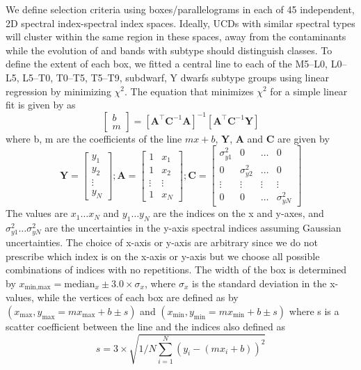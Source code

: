 \documentclass[manuscript]{aastex}
\begin{document}
We define selection criteria using boxes/parallelograms in each of 45 independent, 2D spectral index-spectral index spaces. Ideally, UCDs with similar spectral types will cluster within the same region in these spaces, away from the contaminants while the evolution of \wat and \meth  bands with subtype should distinguish classes. To define the extent of each box, we fitted a central line to each of  the  M5--L0, L0--L5, L5--T0, T0--T5, T5--T9, subdwarf, Y dwarfs subtype groups using linear regression by minimizing $\chi^2$. The equation that minimizes $\chi^2$ for a simple linear fit is given by \citealt{Hogg2010} as \begin{equation}  \begin{bmatrix}  b \\  m \end{bmatrix} =  [\mathbf{A}^\intercal \mathbf{C}^{-1} \mathbf{A}] ^{-1}  [\mathbf{A}^\intercal \mathbf{C}^{-1} \mathbf{Y}]  \end{equation} where b, m are the coefficients of the line $mx+b$,  $\mathbf{Y}$, $\mathbf{A}$ and  $\mathbf{C}$ are given by
\begin{equation} \mathbf{Y}=\begin{bmatrix}  y_1 \\  y_2 \\ \vdots  \\y_N  \end{bmatrix}; \mathbf{A}=\begin{bmatrix} 1 & x_1 \\  1& x_2 \\ \vdots & \vdots \\1 & x_N  \end{bmatrix};
  \mathbf{C}=\begin{bmatrix} \sigma^2_{y1} & 0 & \dots &0 \\  0 &  \sigma^2_{y2} & \dots &0 \\  \vdots & \vdots  & \vdots & \vdots \\0 & 0 & \dots & \sigma^2_{yN}  \end{bmatrix}\end{equation} 
 The values are $x_1 \dots x_N$ and   $y_1 \dots y_N$ are the indices on the x and y-axes, and $\sigma^2_{y1} \dots \sigma^2_{yN} $ are the uncertainties in  the y-axis spectral indices assuming Gaussian uncertainties. The choice of x-axis or y-axis are arbitrary since we do not prescribe which index is on the x-axis or y-axis but we choose all possible combinations of indices with no repetitions.  The width of the box is determined by $x_{\text{min}, \text{max}}= \text{median}_x\pm3.0 \times \sigma_x$,  where $ \sigma_x$ is the standard deviation in the x-values, while the vertices of each box are defined as by $(x_{\text{max}}, y_{\text{max}}=mx_{\text{max}}+b \pm s) $ and $(x_{\text{min}}, y_{\text{min}}=mx_{\text{min}}+b \pm s) $ where s is a scatter coefficient between the line and the indices also defined as \begin{equation} s= 3 \times \sqrt{1/N\sum_{i=1}^N (y_i-(m x_i+b))^2} \end{equation} 
\end{document}
